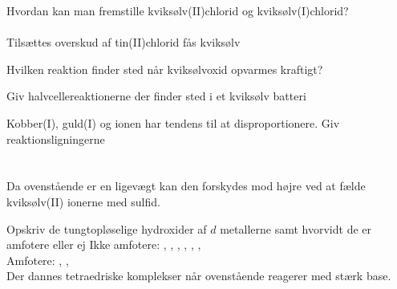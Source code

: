 \begin{flashcard}[Fremstilling]{Hvordan kan man fremstille kviksølv(II)chlorid og kviksølv(I)chlorid?}
\\\vspace*{0.5cm}
\\
Tilsættes overskud af tin(II)chlorid fås kviksølv\\
\end{flashcard}

\begin{flashcard}[Reaktion]{Hvilken reaktion finder sted når kviksølvoxid opvarmes kraftigt?}
\end{flashcard}

\begin{flashcard}[Anvendelse]{Giv halvcellereaktionerne der finder sted i et kviksølv batteri}
\\\vspace*{0.5cm}
\end{flashcard}

\begin{flashcard}[Egenskab]{Kobber(I), guld(I) og  ionen har tendens til at disproportionere. Giv reaktionsligningerne}
\\\vspace*{0.5cm}
\\\vspace*{0.5cm}
\\
Da ovenstående er en ligevægt kan den forskydes mod højre ved at fælde kviksølv(II) ionerne med sulfid.
\end{flashcard}

\begin{flashcard}[Egenskab]{Opskriv de tungtopløselige hydroxider af $d$ metallerne samt hvorvidt de er amfotere eller ej}
Ikke amfotere: , , , , , , \\\vspace*{0.5cm}
Amfotere: , , \\
Der dannes tetraedriske komplekser når ovenstående reagerer med stærk base.
\end{flashcard}
